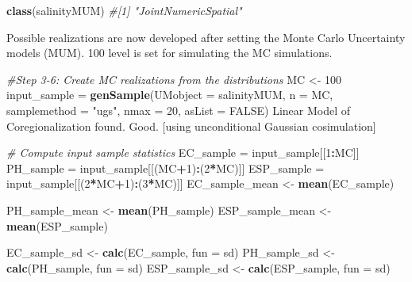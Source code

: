 \documentclass[
  10pt,
  b5paper,
]{book}
\newenvironment{Shaded}{\begin{snugshade}}{\end{snugshade}}
\newcommand{\CommentTok}[1]{\textcolor[rgb]{0.56,0.35,0.01}{\textit{#1}}}
\newcommand{\DataTypeTok}[1]{\textcolor[rgb]{0.13,0.29,0.53}{#1}}
\newcommand{\DecValTok}[1]{\textcolor[rgb]{0.00,0.00,0.81}{#1}}
\newcommand{\KeywordTok}[1]{\textcolor[rgb]{0.13,0.29,0.53}{\textbf{#1}}}
\newcommand{\NormalTok}[1]{#1}
\newcommand{\OperatorTok}[1]{\textcolor[rgb]{0.81,0.36,0.00}{\textbf{#1}}}
\newcommand{\OtherTok}[1]{\textcolor[rgb]{0.56,0.35,0.01}{#1}}
\newcommand{\StringTok}[1]{\textcolor[rgb]{0.31,0.60,0.02}{#1}}
\begin{document}
\begin{Shaded}
\begin{Highlighting}[]
\KeywordTok{class}\NormalTok{(salinityMUM)}
\CommentTok{#[1] "JointNumericSpatial"}
\end{Highlighting}
\end{Shaded}

Possible realizations are now developed after setting the Monte Carlo Uncertainty models (MUM). 100 level is set for simulating the MC simulations.

\begin{Shaded}
\begin{Highlighting}[]
\CommentTok{#Step 3-6: Create MC realizations from the distributions}
\NormalTok{	MC <-}\StringTok{ }\DecValTok{100}
\NormalTok{	input_sample =}\StringTok{ }\KeywordTok{genSample}\NormalTok{(}\DataTypeTok{UMobject =}\NormalTok{ salinityMUM, }\DataTypeTok{n =}\NormalTok{ MC, }\DataTypeTok{samplemethod =} \StringTok{"ugs"}\NormalTok{,	nmax}
\NormalTok{=}\StringTok{ }\DecValTok{20}\NormalTok{, }\DataTypeTok{asList =} \OtherTok{FALSE}\NormalTok{)}
\NormalTok{Linear Model of Coregionalization found. Good. [using unconditional Gaussian cosimulation]}

\CommentTok{# Compute input sample statistics}
\NormalTok{EC_sample =}\StringTok{ }\NormalTok{input_sample[[}\DecValTok{1}\OperatorTok{:}\NormalTok{MC]]}
\NormalTok{PH_sample =}\StringTok{ }\NormalTok{input_sample[[(MC}\OperatorTok{+}\DecValTok{1}\NormalTok{)}\OperatorTok{:}\NormalTok{(}\DecValTok{2}\OperatorTok{*}\NormalTok{MC)]]}
\NormalTok{ESP_sample =}\StringTok{ }\NormalTok{input_sample[[(}\DecValTok{2}\OperatorTok{*}\NormalTok{MC}\OperatorTok{+}\DecValTok{1}\NormalTok{)}\OperatorTok{:}\NormalTok{(}\DecValTok{3}\OperatorTok{*}\NormalTok{MC)]]}
\NormalTok{EC_sample_mean <-}\StringTok{ }\KeywordTok{mean}\NormalTok{(EC_sample)}


\NormalTok{PH_sample_mean <-}\StringTok{ }\KeywordTok{mean}\NormalTok{(PH_sample)}
\NormalTok{ESP_sample_mean <-}\StringTok{ }\KeywordTok{mean}\NormalTok{(ESP_sample)}

\NormalTok{EC_sample_sd <-}\StringTok{ }\KeywordTok{calc}\NormalTok{(EC_sample, }\DataTypeTok{fun =}\NormalTok{ sd)}
\NormalTok{PH_sample_sd <-}\StringTok{ }\KeywordTok{calc}\NormalTok{(PH_sample, }\DataTypeTok{fun =}\NormalTok{ sd)}
\NormalTok{ESP_sample_sd <-}\StringTok{ }\KeywordTok{calc}\NormalTok{(ESP_sample, }\DataTypeTok{fun =}\NormalTok{ sd)}


\end{Highlighting}
\end{Shaded}
\end{document}
